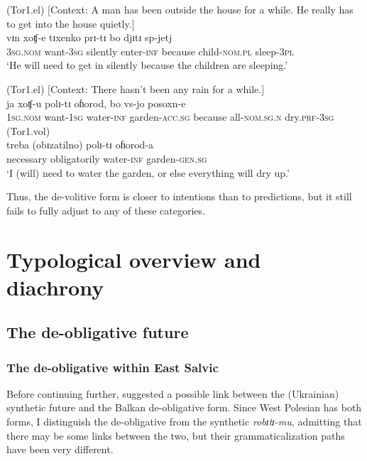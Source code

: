 \documentclass[output=paper,colorlinks,citecolor=brown]{langscibook}
\begin{document}
\ea \label{ex:roncero:16}
   (Tor1.el) [Context: A man has been outside the house for a while. He really has to get into the house quietly.]\\
    \gll vɪn xoʧ-e tɪxenko prɪ-tɪ bo djɪtɪ sp-jetj\\
    3\textsc{sg.nom} want-\textsc{3sg} silently enter-\textsc{inf} because child-\textsc{nom.pl} sleep-\textsc{3pl}\\
    \glt ‘He will need to get in silently because the children are sleeping.’
\z

\ea \label{ex:roncero:17}
\ea \label{ex:roncero:17a}
    (Tor1.el) [Context: There hasn't been any rain for a while.]\\
    \gll *ja xoʧ-u polɪ-tɪ oɦorod, bo vs-jo posoxn-e\\
    1\textsc{sg.nom} want-\textsc{1sg} water-\textsc{inf} garden-\textsc{acc.sg} because all-\textsc{nom.sg.n} dry.\textsc{prf-3sg}\\

\ex \label{ex:roncero:17b}
    (Tor1.vol) \textrangle{}\textrangle{} \\
    \gll treba (obɪzatilno) polɪ-tɪ oɦorod-a\\
    necessary obligatorily water-\textsc{inf} garden-\textsc{gen.sg}\\
    \glt ‘I (will) need to water the garden, or else everything will dry up.’
    \z
\z

Thus, the de-volitive form is closer to intentions than to predictions, but it still fails to fully adjust to any of these categories.

\section{Typological overview and diachrony} \label{sec:roncero:3}
\subsection{The de-obligative future} \label{sec:roncero:3.1}
\subsubsection{The de-obligative within East Salvic} \label{sec:roncero:3.1.1}
Before continuing further, \citet[323]{Dahl2000b} suggested a possible link between the (Ukrainian) synthetic future and the Balkan de-obligative form. Since West Polesian has both forms, I distinguish the de-obligative from the synthetic \textit{robɪtɪ-mu}, admitting that there may be some links between the two, but their grammaticalization paths have been very different.
\end{document}

